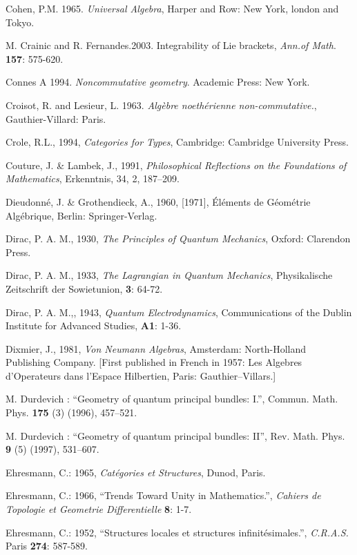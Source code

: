 \documentclass[12pt]{article}
\theoremstyle{plain}
\theoremstyle{definition}
\numberwithin{equation}{section}
\begin{document}
\begin{thebibliography}{99}
Cohen, P.M. 1965. {\em Universal Algebra}, Harper and Row: New York, london and Tokyo.

M. Crainic and R. Fernandes.2003. Integrability of Lie brackets, {\em Ann.of Math}. \textbf{157}: 575-620.

Connes A 1994. \emph{Noncommutative geometry}. Academic Press: New York.

Croisot, R. and Lesieur, L. 1963. \emph{Alg\`ebre noeth\'erienne non-commutative.},
Gauthier-Villard: Paris.

Crole, R.L., 1994, {\em Categories for Types}, Cambridge: Cambridge University Press.  

Couture, J. \& Lambek, J., 1991, {\em Philosophical Reflections on the Foundations of Mathematics}, Erkenntnis, 34, 2, 187--209. 

Dieudonn\'e, J. \& Grothendieck, A., 1960, [1971], \'El\'ements de G\'eom\'etrie Alg\'ebrique, Berlin: Springer-Verlag.  

Dirac, P. A. M., 1930, {\em The Principles of Quantum Mechanics}, Oxford: Clarendon 
Press. 

Dirac, P. A. M., 1933, {\em The Lagrangian in Quantum Mechanics}, Physikalische 
Zeitschrift der Sowietunion, \textbf{3}: 64-72. 

Dirac, P. A. M.,, 1943, {\em Quantum Electrodynamics}, Communications of the Dublin 
Institute for Advanced Studies, \textbf{A1}: 1-36. 

Dixmier, J., 1981, {\em Von Neumann Algebras}, Amsterdam: North-Holland Publishing 
Company. [First published in French in 1957: Les Algebres d'Operateurs dans 
l'Espace Hilbertien, Paris: Gauthier--Villars.]

M. Durdevich : ``Geometry of quantum principal bundles: I.'', Commun.
Math. Phys. \textbf{175} (3) (1996), 457--521.

M. Durdevich : ``Geometry of quantum principal bundles: II'', Rev.
Math. Phys. \textbf{9} (5) (1997), 531--607.

Ehresmann, C.: 1965, \emph{Cat\'egories et Structures}, Dunod, Paris.

Ehresmann, C.: 1966, ``Trends Toward Unity in Mathematics.'',
\emph{Cahiers de Topologie et Geometrie Differentielle}
\textbf{8}: 1-7.

Ehresmann, C.: 1952, ``Structures locales et structures infinit\'esimales.'',
\emph{C.R.A.S.} Paris \textbf{274}: 587-589.


\end{thebibliography}
\end{document}
